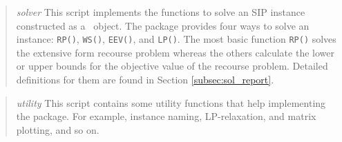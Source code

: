 \begin{quotation}
	\noindent\textit{solver} This script implements the functions to solve an SIP instance constructed as a \jumpmodel\ object. The package provides four ways to solve an instance: \texttt{RP()}, \texttt{WS()}, \texttt{EEV()}, and \texttt{LP()}. The most basic function \texttt{RP()} solves the extensive form recourse problem whereas the others calculate the lower or upper bounds for the objective value of the recourse problem. Detailed definitions for them are found in Section \ref{subsec:sol_report}.
\end{quotation}

\begin{quotation}
	\noindent\textit{utility} This script contains some utility functions that help implementing the package. For example, instance naming, LP-relaxation, and matrix plotting, and so on.
\end{quotation}




